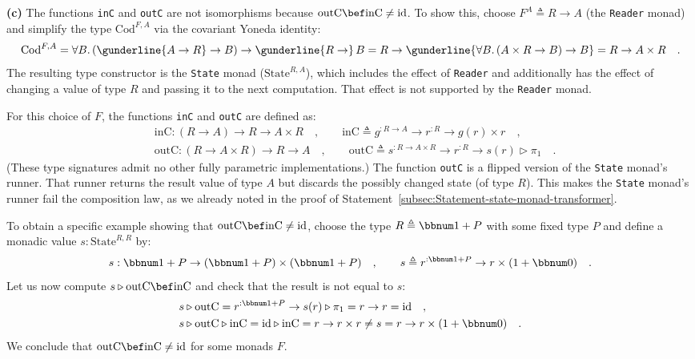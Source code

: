 \textbf{(c)} The functions \lstinline!inC! and \lstinline!outC!
are not isomorphisms because $\text{outC}\bef\text{inC}\not=\text{id}$.
To show this, choose $F^{A}\triangleq R\rightarrow A$ (the \lstinline!Reader!
monad) and simplify the type $\text{Cod}^{F,A}$ via the covariant
Yoneda identity:
\[
\text{Cod}^{F,A}=\forall B.\,(\gunderline{A\rightarrow R}\rightarrow B)\rightarrow\gunderline{R\rightarrow}\,B=R\rightarrow\gunderline{\forall B.\,(A\times R\rightarrow B)\rightarrow B}=R\rightarrow A\times R\quad.
\]
The resulting type constructor is the \lstinline!State! monad ($\text{State}^{R,A}$),
which includes the effect of \lstinline!Reader! and additionally
has the effect of changing a value of type $R$ and passing it to
the next computation. That effect is not supported by the \lstinline!Reader!
monad. 

For this choice of $F$, the functions \lstinline!inC! and \lstinline!outC!
are defined as:
\begin{align*}
 & \text{inC}:\left(R\rightarrow A\right)\rightarrow R\rightarrow A\times R\quad,\quad\quad\text{inC}\triangleq g^{:R\rightarrow A}\rightarrow r^{:R}\rightarrow g(r)\times r\quad,\\
 & \text{outC}:\left(R\rightarrow A\times R\right)\rightarrow R\rightarrow A\quad,\quad\quad\text{outC}\triangleq s^{:R\rightarrow A\times R}\rightarrow r^{:R}\rightarrow s(r)\triangleright\pi_{1}\quad.
\end{align*}
(These type signatures admit no other fully parametric implementations.)
The function \lstinline!outC! is a flipped version of the \lstinline!State!
monad\textsf{'}s runner. That runner returns the result value of type $A$
but discards the possibly changed state (of type $R$). This makes
the \lstinline!State! monad\textsf{'}s runner fail the composition law, as
we already noted in the proof of Statement~\ref{subsec:Statement-state-monad-transformer}.

To obtain a specific example showing that $\text{outC}\bef\text{inC}\neq\text{id}$,
choose the type $R\triangleq\bbnum 1+P$ with some fixed type $P$
and define a monadic value $s:\text{State}^{R,R}$ by:
\[
s:\bbnum 1+P\rightarrow(\bbnum 1+P)\times(\bbnum 1+P)\quad,\quad\quad s\triangleq r^{:\bbnum 1+P}\rightarrow r\times(1+\bbnum 0)\quad.
\]
Let us now compute $s\triangleright\text{outC}\bef\text{inC}$ and
check that the result is not equal to $s$:
\begin{align*}
 & s\triangleright\text{outC}=r^{:\bbnum 1+P}\rightarrow s(r)\triangleright\pi_{1}=r\rightarrow r=\text{id}\quad,\\
 & s\triangleright\text{outC}\triangleright\text{inC}=\text{id}\triangleright\text{inC}=r\rightarrow r\times r\neq s=r\rightarrow r\times(1+\bbnum 0)\quad.
\end{align*}
We conclude that $\text{outC}\bef\text{inC}\neq\text{id}$ for some
monads $F$.

